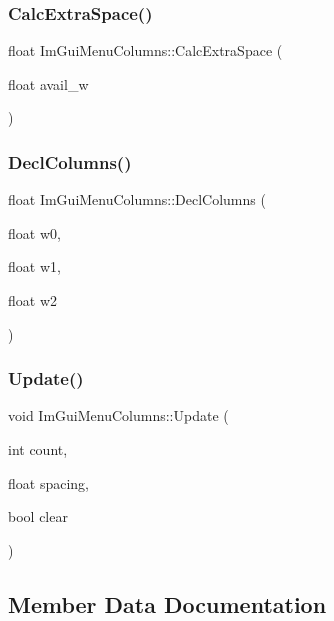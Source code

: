 \subsubsection{\texorpdfstring{Calc\+Extra\+Space()}{CalcExtraSpace()}}
{\footnotesize\ttfamily float Im\+Gui\+Menu\+Columns\+::\+Calc\+Extra\+Space (\begin{DoxyParamCaption}\item[{float}]{avail\+\_\+w }\end{DoxyParamCaption})}

\mbox{\label{struct_im_gui_menu_columns_ad8d50936ca3240d75c285d7e373bc892}} 
\subsubsection{\texorpdfstring{Decl\+Columns()}{DeclColumns()}}
{\footnotesize\ttfamily float Im\+Gui\+Menu\+Columns\+::\+Decl\+Columns (\begin{DoxyParamCaption}\item[{float}]{w0,  }\item[{float}]{w1,  }\item[{float}]{w2 }\end{DoxyParamCaption})}

\mbox{\label{struct_im_gui_menu_columns_a1104dfb001d48ab8c89bb1858da0eaf8}} 
\subsubsection{\texorpdfstring{Update()}{Update()}}
{\footnotesize\ttfamily void Im\+Gui\+Menu\+Columns\+::\+Update (\begin{DoxyParamCaption}\item[{int}]{count,  }\item[{float}]{spacing,  }\item[{bool}]{clear }\end{DoxyParamCaption})}



\subsection{Member Data Documentation}
\mbox{\label{struct_im_gui_menu_columns_af466eaa48622ff8c431b99cf46719ba5}} 
